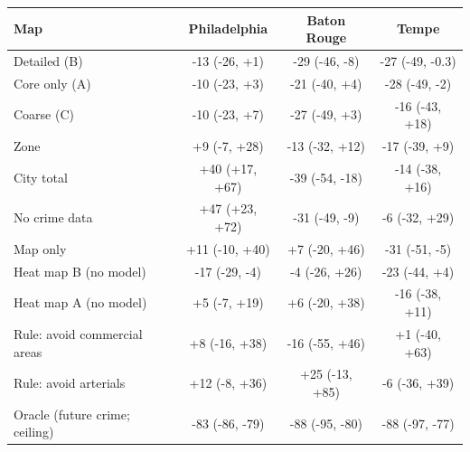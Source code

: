 \begin{tabular}{lccc}
\toprule
Map & Philadelphia & Baton Rouge & Tempe \\
\midrule
Detailed (B) & -13 (-26, +1) & -29 (-46, -8) & -27 (-49, -0.3) \\
Core only (A) & -10 (-23, +3) & -21 (-40, +4) & -28 (-49, -2) \\
Coarse (C) & -10 (-23, +7) & -27 (-49, +3) & -16 (-43, +18) \\
\midrule
Zone & +9 (-7, +28) & -13 (-32, +12) & -17 (-39, +9) \\
City total & +40 (+17, +67) & -39 (-54, -18) & -14 (-38, +16) \\
\midrule
No crime data & +47 (+23, +72) & -31 (-49, -9) & -6 (-32, +29) \\
Map only & +11 (-10, +40) & +7 (-20, +46) & -31 (-51, -5) \\
\midrule
Heat map B (no model) & -17 (-29, -4) & -4 (-26, +26) & -23 (-44, +4) \\
Heat map A (no model) & +5 (-7, +19) & +6 (-20, +38) & -16 (-38, +11) \\
Rule: avoid commercial areas & +8 (-16, +38) & -16 (-55, +46) & +1 (-40, +63) \\
Rule: avoid arterials & +12 (-8, +36) & +25 (-13, +85) & -6 (-36, +39) \\
\midrule
Oracle (future crime; ceiling) & -83 (-86, -79) & -88 (-95, -80) & -88 (-97, -77) \\
\bottomrule
\end{tabular}
